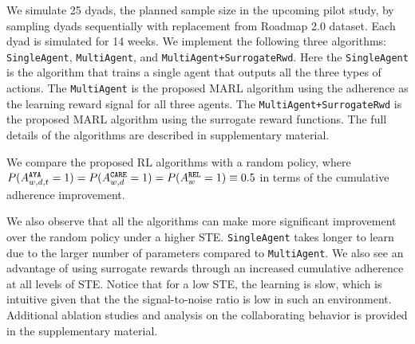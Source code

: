 



We simulate 25 dyads, the planned sample size in the upcoming pilot study, by sampling dyads sequentially with replacement from Roadmap 2.0 dataset. Each dyad is simulated for 14 weeks. We implement the following three algorithms: \texttt{SingleAgent}, \texttt{MultiAgent}, and \texttt{MultiAgent+SurrogateRwd}. Here the \texttt{SingleAgent} is the algorithm that trains a single agent that outputs all the three types of actions. The \texttt{MultiAgent} is the proposed MARL algorithm using the adherence as the learning reward signal for all three agents. The \texttt{MultiAgent+SurrogateRwd} is the proposed MARL algorithm using the surrogate reward functions.
The full details of the algorithms are described in supplementary material.%

We compare the proposed RL algorithms with a random policy, where $P(A_{w,d,t}^{\tiny\texttt{AYA}}=1)= P(A_{w,d}^{\tiny\texttt{CARE}}=1) = P(A_w^{\tiny\texttt{REL}}=1)\equiv0.5$ in terms of the cumulative adherence improvement. 

We also observe that all the algorithms can make more significant improvement over the random policy under a higher STE. \texttt{SingleAgent} takes longer to learn due to the larger number of parameters compared to \texttt{MultiAgent}. We also see an advantage of using surrogate rewards through an increased cumulative adherence  at all levels of STE. Notice that for a low STE, the learning is slow, which is intuitive given that the the signal-to-noise ratio is low in such an environment. Additional ablation studies and analysis on the collaborating behavior is provided in the supplementary material. 

